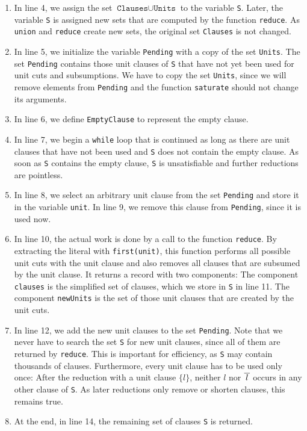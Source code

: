 \begin{enumerate}
\item In line 4, we assign the set $\texttt{Clauses} \cup \texttt{Units}$ to the variable \texttt{S}.  Later, the
  variable \texttt{S} is assigned new sets that are computed by the function \texttt{reduce}.  As
  \texttt{union} and \texttt{reduce} create new sets, the original set \texttt{Clauses} is not changed.
\item In line 5, we initialize the variable \texttt{Pending} with a copy of the set \texttt{Units}.  The set
  \texttt{Pending} contains those unit clauses of \texttt{S} that have not yet been used for unit cuts and
  subsumptions.  We have to copy the set \texttt{Units}, since we will remove elements from \texttt{Pending}
  and the function \texttt{saturate} should not change its arguments.
\item In line 6, we define \texttt{EmptyClause} to represent the empty clause.
\item In line 7, we begin a \texttt{while} loop that is continued as long as there are unit clauses that have
  not been used and \texttt{S} does not contain the empty clause.  As soon as \texttt{S} contains the empty
  clause, \texttt{S} is unsatisfiable and further reductions are pointless.
\item In line 8, we select an arbitrary unit clause from the set \texttt{Pending} and store it in the variable
  \texttt{unit}.  In line 9, we remove this clause from \texttt{Pending}, since it is used now.
\item In line 10, the actual work is done by a call to the function \texttt{reduce}. By extracting the literal
  with \texttt{first(unit)}, this function performs all possible unit cuts with the unit clause and also
  removes all clauses that are subsumed by the unit clause.  It returns a record with two components: The
  component \texttt{clauses} is the simplified set of clauses, which we store in \texttt{S} in line 11.  The
  component \texttt{newUnits} is the set of those unit clauses that are created by the unit cuts.
\item In line 12, we add the new unit clauses to the set \texttt{Pending}.  Note that we never have to search
  the set \texttt{S} for new unit clauses, since all of them are returned by \texttt{reduce}.  This is
  important for efficiency, as \texttt{S} may contain thousands of clauses.  Furthermore, every unit clause
  has to be used only once:  After the reduction with a unit clause $\{l\}$, neither $l$ nor $\overline{\,l\,}$
  occurs in any other clause of \texttt{S}.  As later reductions only remove or shorten clauses, this remains
  true.
\item At the end, in line 14, the remaining set of clauses \texttt{S} is returned.
\end{enumerate}



